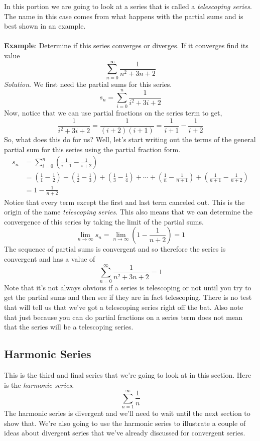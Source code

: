 \documentclass[10pt,reqno]{book}
\theoremstyle{definition}
\begin{document}
	In this portion we are going to look at a series that is called a \textit{telescoping series}. The name in this case comes from what happens with the partial sums and is best shown in an example.\\ \\
	\textbf{Example}: Determine if this series converges or diverges. If it converges find its value
	\[ \sum\limits_{n=0}^{\infty} \frac{1}{n^2 + 3n + 2} \]
	\textit{Solution}. We first need the partial sums for this series.
	\[ s_n = \sum\limits_{i=0}^{n} \frac{1}{i^2 + 3i + 2} \]
	Now, notice that we can use partial fractions on the series term to get,
	\[ \frac{1}{i^2 + 3i + 2} = \frac{1}{(i+2)(i+1)} = \frac{1}{i+1} - \frac{1}{i+2} \]
	So, what does this do for us? Well, let's start writing out the terms of the general partial sum for this series using the partial fraction form.
	\begin{align*}
		s_n &= \sum\limits_{i=0}^{n} \left( \frac{1}{i+1} - \frac{1}{i+2} \right)\\
		&= \left( \frac{1}{1} - \frac{1}{2} \right) + \left( \frac{1}{2} - \frac{1}{3} \right) + \left( \frac{1}{3} - \frac{1}{4} \right) + \cdots + \left( \frac{1}{n} - \frac{1}{n+1} \right) + \left( \frac{1}{n+1} - \frac{1}{n+2} \right)\\
		&= 1 - \frac{1}{n+2}
	\end{align*}
	Notice that every term except the first and last term canceled out. This is the origin of the name \textit{telescoping series}. This also means that we can determine the convergence of this series by taking the limit of the partial sums.
	\[ \lim\limits_{n \to \infty} s_n = \lim\limits_{n \to \infty} \left( 1 - \frac{1}{n+2} \right) = 1 \]
	The sequence of partial sums is convergent and so therefore the series is convergent and has a value of
	\[ \sum\limits_{n=0}^{\infty} \frac{1}{n^2 + 3n + 2} = 1 \]
	Note that it's not always obvious if a series is telescoping or not until you try to get the partial sums and then see if they are in fact telescoping. There is no test that will tell us that we've got a telescoping series right off the bat.  Also note that just because you can do partial fractions on a series term does not mean that the series will be a telescoping series.
	
	\subsection*{Harmonic Series}
	
	This is the third and final series that we’re going to look at in this section.  Here is the \textit{harmonic series}.
	\[ \sum\limits_{n=1}^{\infty} \frac{1}{n} \]
	The harmonic series is divergent and we'll need to wait until the next section to show that. We're also going to use the harmonic series to illustrate a couple of ideas about divergent series that we've already discussed for convergent series. 
	
\end{document}
